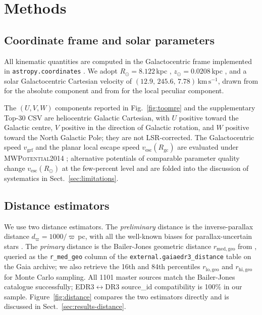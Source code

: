 \documentclass{caosp310}
\newcommand{\vgrf}{v_{\mathrm{grf}}}
\newcommand{\vesc}{v_{\mathrm{esc}}}
\newcommand{\Rgc}{R_{\mathrm{gc}}}
\newcommand{\dBJ}{r_{\mathrm{med,geo}}}
\newcommand{\kmps}{\ensuremath{\,\mathrm{km}\,\mathrm{s}^{-1}}}
\begin{document}
\section{Methods}
\label{sec:methods}

\subsection{Coordinate frame and solar parameters}
\label{sec:frame}

\begin{sloppypar}
All kinematic quantities are computed in the Galactocentric frame
implemented in \texttt{astropy.coordinates}
\citep{Astropy2013,Astropy2018}. We adopt $R_\odot = 8.122$\,kpc
\citep{Gravity2018R0}, $z_\odot = 0.0208$\,kpc
\citep{BennettBovy2019Zsun}, and a solar Galactocentric Cartesian
velocity of $(12.9,\,245.6,\,7.78)\kmps$, drawn from
\citet{ReidBrunthaler2020SolarMotion} for the absolute component and
from \citet{Schoenrich2010LSR} for the local peculiar component.
\end{sloppypar}
The $(U,V,W)$ components reported in
Fig.~\ref{fig:toomre} and the supplementary Top-30 CSV are heliocentric
Galactic
Cartesian, with $U$ positive toward the Galactic centre, $V$ positive in
the direction of Galactic rotation, and $W$ positive toward the North
Galactic Pole; they are not LSR-corrected. The Galactocentric speed
$\vgrf$ and the planar local escape speed $\vesc(\Rgc)$ are evaluated
under \textsc{MWPotential2014} \citep{Bovy2015galpy}; alternative
potentials of comparable parameter quality
\citep{McMillan2017MWMass,Piffl2014RAVEvesc,Monari2018Vesc} change
$\vesc(R_\odot)$ at the few-percent level and are folded into the
discussion of systematics in Sect.~\ref{sec:limitations}.

\subsection{Distance estimators}
\label{sec:distance}

We use two distance estimators. The \emph{preliminary} distance is the
inverse-parallax distance $d_\varpi=1000/\varpi$\,pc, with all the
well-known biases for parallax-uncertain stars
\citep{BailerJones2015Distances,Luri2018GaiaParallaxes}. The
\emph{primary} distance is the Bailer-Jones geometric distance
$\dBJ$ from \citet{BailerJones2021Distances}, queried as the
\texttt{r\_med\_geo} column of the \texttt{external.gaiaedr3\_distance}
table on the Gaia archive; we also retrieve the 16th and 84th percentiles
$r_{\mathrm{lo,geo}}$ and $r_{\mathrm{hi,geo}}$ for Monte Carlo sampling.
All 1101 master sources match the Bailer-Jones catalogue successfully;
EDR3$\leftrightarrow$DR3 source\_id compatibility is 100\% in our sample.
Figure~\ref{fig:distance} compares the two estimators directly and is
discussed in Sect.~\ref{sec:results-distance}.
\end{document}

